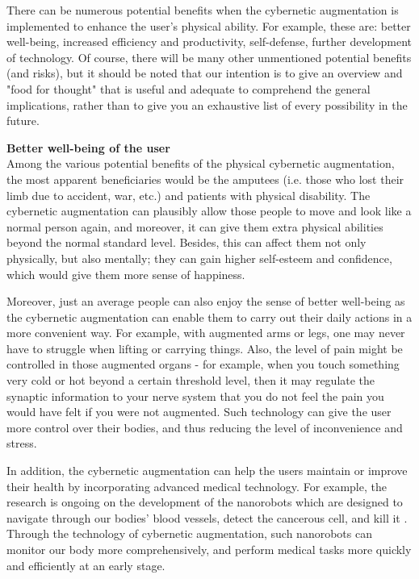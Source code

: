 There can be numerous potential benefits when the cybernetic augmentation is implemented to enhance the user's physical ability. For example, these are: better well-being, increased efficiency and productivity, self-defense, further development of technology. Of course, there will be many other unmentioned potential benefits (and risks), but it should be noted that our intention is to give an overview and "food for thought" that is useful and adequate to comprehend the general implications, rather than to give you an exhaustive list of every possibility in the future. 


{\bf Better well-being of the user} \\
Among the various potential benefits of the physical cybernetic augmentation, the most apparent beneficiaries would be the amputees (i.e. those who lost their limb due to accident, war, etc.) and patients with physical disability. The cybernetic augmentation can plausibly allow those people to move and look like a normal person again, and moreover, it can give them extra physical abilities beyond the normal standard level. Besides, this can affect them not only physically, but also mentally; they can gain higher self-esteem and confidence, which would give them more sense of happiness. 

Moreover, just an average people can also enjoy the sense of better well-being as the cybernetic augmentation can enable them to carry out their daily actions in a more convenient way. For example, with augmented arms or legs, one may never have to struggle when lifting or carrying things. Also, the level of pain might be controlled in those augmented organs - for example, when you touch something very cold or hot beyond a certain threshold level, then it may regulate the synaptic information to your nerve system that you do not feel the pain you would have felt if you were not augmented. Such technology can give the user more control over their bodies, and thus reducing the level of inconvenience and stress.

In addition, the cybernetic augmentation can help the users maintain or improve their health by incorporating advanced medical technology. For example, the research is ongoing on the development of the nanorobots which are designed to navigate through our bodies' blood vessels, detect the cancerous cell, and kill it \cite{nanorobot}. Through the technology of cybernetic augmentation, such nanorobots can monitor our body more comprehensively, and perform medical tasks more quickly and efficiently at an early stage. 

